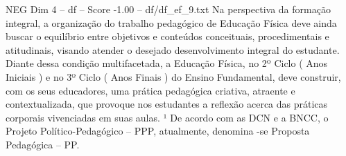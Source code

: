 \begin{textsample}{NEG Dim 4 – df – Score -1.00 – df/df\_ef\_9.txt}
Na perspectiva da formação integral, a organização do trabalho pedagógico de Educação Física deve ainda buscar o equilíbrio entre objetivos e conteúdos conceituais, procedimentais e atitudinais, visando atender o desejado desenvolvimento integral do estudante.
Diante dessa condição multifacetada, a Educação Física, no 2º Ciclo ( Anos Iniciais ) e no 3º Ciclo ( Anos Finais ) do Ensino Fundamental, deve construir, com os seus educadores, uma prática pedagógica criativa, atraente e contextualizada, que provoque nos estudantes a reflexão acerca das práticas corporais vivenciadas em suas aulas. ¹ De acordo com as DCN e a BNCC, o Projeto Político-Pedagógico – PPP, atualmente, denomina -se Proposta Pedagógica – PP.

\end{textsample}
